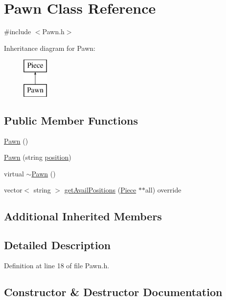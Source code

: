 \hypertarget{class_pawn}{}\section{Pawn Class Reference}
\label{class_pawn}


{\ttfamily \#include $<$Pawn.\+h$>$}

Inheritance diagram for Pawn\+:\begin{figure}[H]
\begin{center}
\leavevmode
\includegraphics[height=2.000000cm]{class_pawn}
\end{center}
\end{figure}
\subsection*{Public Member Functions}
\begin{DoxyCompactItemize}
\item 
\hyperlink{class_pawn_ab7880b10c514f4b9fab9766fbe7c06fd}{Pawn} ()
\item 
\hyperlink{class_pawn_ad99c9b105e0b0d5fbb479959730422e2}{Pawn} (string \hyperlink{class_piece_a1b93d0ecc14e15fc7f3fb5def518502a}{position})
\item 
virtual \hyperlink{class_pawn_a3095938fb8326469c3bd05da0b8f50af}{$\sim$\+Pawn} ()
\item 
vector$<$ string $>$ \hyperlink{class_pawn_a140eb39f4412a235d3e1ab5f533725e8}{get\+Avail\+Positions} (\hyperlink{class_piece}{Piece} $\ast$$\ast$all) override
\end{DoxyCompactItemize}
\subsection*{Additional Inherited Members}


\subsection{Detailed Description}


Definition at line 18 of file Pawn.\+h.



\subsection{Constructor \& Destructor Documentation}
